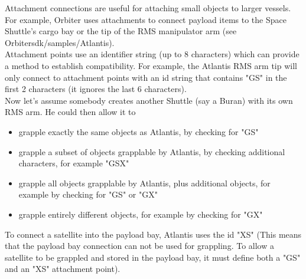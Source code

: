 \documentclass[Orbiter Developer Manual.tex]{subfiles}
\begin{document}
\noindent
Attachment connections are useful for attaching small objects to larger vessels. For example, Orbiter uses attachments to connect payload items to the Space Shuttle's cargo bay or the tip of the RMS manipulator arm (see Orbitersdk/samples/Atlantis).\\
Attachment points use an identifier string (up to 8 characters) which can provide a method to establish compatibility. For example, the Atlantis RMS arm tip will only connect to attachment points with an id string that contains "GS" in the first 2 characters (it ignores the last 6 characters).\\
Now let's assume somebody creates another Shuttle (say a Buran) with its own RMS arm. He could then allow it to
\begin{itemize}
\item grapple exactly the same objects as Atlantis, by checking for "GS"
\item grapple a subset of objects grapplable by Atlantis, by checking additional characters, for example "GSX"
\item grapple all objects grapplable by Atlantis, plus additional objects, for example by checking for "GS" or "GX"
\item grapple entirely different objects, for example by checking for "GX"
\end{itemize}

\noindent
To connect a satellite into the payload bay, Atlantis uses the id "XS" (This means that the payload bay connection can not be used for grappling. To allow a satellite to be grappled and stored in the payload bay, it must define both a "GS" and an "XS" attachment point).
\end{document}
